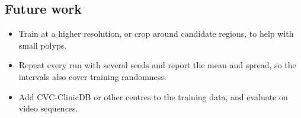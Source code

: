 \subsection{Future work}
\label{sec:future}
\begin{itemize}
  \item Train at a higher resolution, or crop around candidate regions, to help with small polyps.
  \item Repeat every run with several seeds and report the mean and spread, so the intervals also cover training randomness.
  \item Add CVC-ClinicDB or other centres to the training data, and evaluate on video sequences.
\end{itemize}
